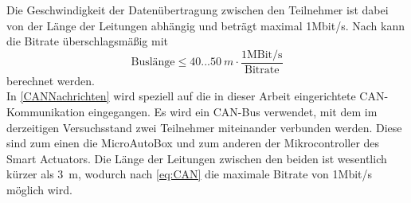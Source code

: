 Die Geschwindigkeit der Datenübertragung zwischen den Teilnehmer ist dabei von der Länge der Leitungen abhängig und beträgt maximal 1Mbit/s. Nach \cite[S.58]{Werner2014} kann die Bitrate überschlagsmäßig mit 
\begin{equation}
	\text{Buslänge}\leq 40...\SI{50}{m}\cdot \frac{1\text{MBit/s}}{\text{Bitrate}}
	\label{eq:CAN}
\end{equation}
berechnet werden.\\
In \autoref{CANNachrichten} wird speziell auf die in dieser Arbeit eingerichtete CAN-Kommunikation eingegangen. Es wird ein CAN-Bus verwendet, mit dem im derzeitigen Versuchsstand zwei Teilnehmer miteinander verbunden werden. Diese sind zum einen die MicroAutoBox und zum anderen der Mikrocontroller des Smart Actuators. Die Länge der Leitungen zwischen den beiden ist wesentlich kürzer als \SI{3}{m}, wodurch nach \autoref{eq:CAN} die maximale Bitrate von 1Mbit/s möglich wird.

